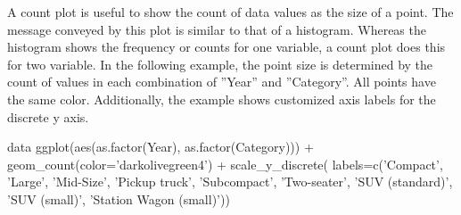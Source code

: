



A count plot is useful to show the count of data values as the size of a point. The message conveyed by this plot is similar to that of a histogram. Whereas the histogram shows the frequency or counts for one variable, a count plot does this for two variable. In the following example, the point size is determined by the count of values in each combination of ''Year'' and ''Category''. All points have the same color. Additionally, the example shows customized axis labels for the discrete y axis. 

\begin{samepage}
\begin{Rcode}
data %
ggplot(aes(as.factor(Year), as.factor(Category))) +
    geom_count(color='darkolivegreen4') +
    scale_y_discrete(
      labels=c('Compact', 'Large', 'Mid-Size', 'Pickup truck', 
               'Subcompact', 'Two-seater', 'SUV (standard)', 
               'SUV (small)', 'Station Wagon (small)'))
\end{Rcode}
\end{samepage}

